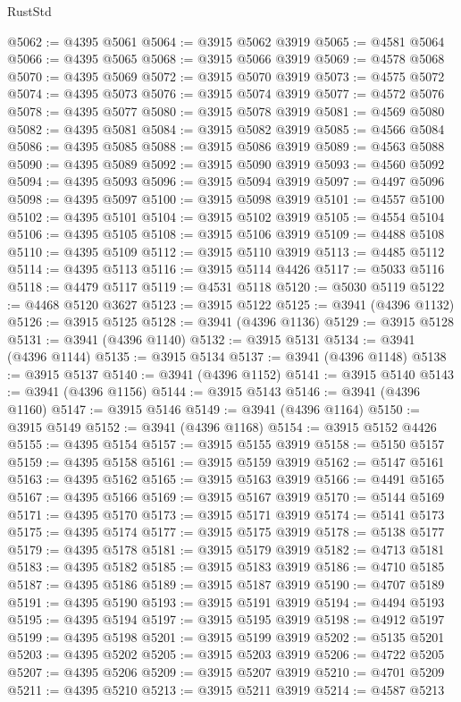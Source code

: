 \begin{lexlean}{RustStd}
\begin{coremodule}
@5062 := @4395 @5061
@5064 := @3915 @5062 @3919
@5065 := @4581 @5064
@5066 := @4395 @5065
@5068 := @3915 @5066 @3919
@5069 := @4578 @5068
@5070 := @4395 @5069
@5072 := @3915 @5070 @3919
@5073 := @4575 @5072
@5074 := @4395 @5073
@5076 := @3915 @5074 @3919
@5077 := @4572 @5076
@5078 := @4395 @5077
@5080 := @3915 @5078 @3919
@5081 := @4569 @5080
@5082 := @4395 @5081
@5084 := @3915 @5082 @3919
@5085 := @4566 @5084
@5086 := @4395 @5085
@5088 := @3915 @5086 @3919
@5089 := @4563 @5088
@5090 := @4395 @5089
@5092 := @3915 @5090 @3919
@5093 := @4560 @5092
@5094 := @4395 @5093
@5096 := @3915 @5094 @3919
@5097 := @4497 @5096
@5098 := @4395 @5097
@5100 := @3915 @5098 @3919
@5101 := @4557 @5100
@5102 := @4395 @5101
@5104 := @3915 @5102 @3919
@5105 := @4554 @5104
@5106 := @4395 @5105
@5108 := @3915 @5106 @3919
@5109 := @4488 @5108
@5110 := @4395 @5109
@5112 := @3915 @5110 @3919
@5113 := @4485 @5112
@5114 := @4395 @5113
@5116 := @3915 @5114 @4426
@5117 := @5033 @5116
@5118 := @4479 @5117
@5119 := @4531 @5118
@5120 := @5030 @5119
@5122 := @4468 @5120 @3627
@5123 := @3915 @5122
@5125 := @3941 (@4396 @1132)
@5126 := @3915 @5125
@5128 := @3941 (@4396 @1136)
@5129 := @3915 @5128
@5131 := @3941 (@4396 @1140)
@5132 := @3915 @5131
@5134 := @3941 (@4396 @1144)
@5135 := @3915 @5134
@5137 := @3941 (@4396 @1148)
@5138 := @3915 @5137
@5140 := @3941 (@4396 @1152)
@5141 := @3915 @5140
@5143 := @3941 (@4396 @1156)
@5144 := @3915 @5143
@5146 := @3941 (@4396 @1160)
@5147 := @3915 @5146
@5149 := @3941 (@4396 @1164)
@5150 := @3915 @5149
@5152 := @3941 (@4396 @1168)
@5154 := @3915 @5152 @4426
@5155 := @4395 @5154
@5157 := @3915 @5155 @3919
@5158 := @5150 @5157
@5159 := @4395 @5158
@5161 := @3915 @5159 @3919
@5162 := @5147 @5161
@5163 := @4395 @5162
@5165 := @3915 @5163 @3919
@5166 := @4491 @5165
@5167 := @4395 @5166
@5169 := @3915 @5167 @3919
@5170 := @5144 @5169
@5171 := @4395 @5170
@5173 := @3915 @5171 @3919
@5174 := @5141 @5173
@5175 := @4395 @5174
@5177 := @3915 @5175 @3919
@5178 := @5138 @5177
@5179 := @4395 @5178
@5181 := @3915 @5179 @3919
@5182 := @4713 @5181
@5183 := @4395 @5182
@5185 := @3915 @5183 @3919
@5186 := @4710 @5185
@5187 := @4395 @5186
@5189 := @3915 @5187 @3919
@5190 := @4707 @5189
@5191 := @4395 @5190
@5193 := @3915 @5191 @3919
@5194 := @4494 @5193
@5195 := @4395 @5194
@5197 := @3915 @5195 @3919
@5198 := @4912 @5197
@5199 := @4395 @5198
@5201 := @3915 @5199 @3919
@5202 := @5135 @5201
@5203 := @4395 @5202
@5205 := @3915 @5203 @3919
@5206 := @4722 @5205
@5207 := @4395 @5206
@5209 := @3915 @5207 @3919
@5210 := @4701 @5209
@5211 := @4395 @5210
@5213 := @3915 @5211 @3919
@5214 := @4587 @5213

\end{coremodule}
\end{lexlean}

